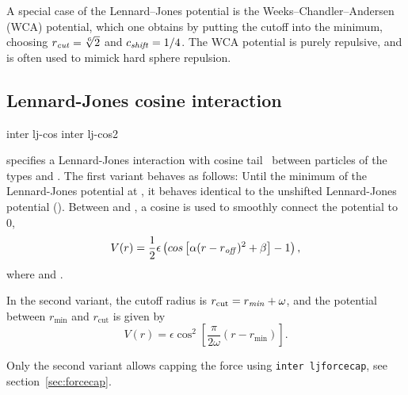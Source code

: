 A special case of the Lennard--Jones potential is the Weeks--Chandler--Andersen
(WCA) potential, which one obtains by putting the cutoff into the minimum, \ie
choosing $r_\text{\mbox{\textrm{\textit{cut}}}}=\sqrt[6]{2}$ and $c_\text{\mbox{\textrm{\textit{shift}}}}=1/4$. The WCA
potential is purely repulsive, and is often used to mimick hard sphere repulsion.

\subsection{Lennard-Jones cosine interaction}
\begin{essyntax}
  inter   lj-cos
  \var{$\epsilon$} \var{$\sigma$}
   
  inter   lj-cos2
  \var{$\epsilon$} \var{$\sigma$} 
   \var{$\omega$}
  \begin{features}
  \end{features}
\end{essyntax}
specifies a Lennard-Jones interaction with cosine tail~\cite{soddeman01a} between
particles of the types  and . The first variant behaves as
follows: Until the minimum of the Lennard-Jones potential at , it behaves identical to the
unshifted Lennard-Jones potential ().  Between
 and , a cosine is used to smoothly
connect the potential to 0, \ie
\begin{equation}
  V(r)=\frac{1}{2}\epsilon\left(cos\left[\alpha(r-r_\text{\mbox{\textrm{\textit{off}}}})^2 + \beta\right]-1\right),
\end{equation}
where
and
.

In the second variant, the cutoff radius is $r_\text{cut}=r_\text{\mbox{\textrm{\textit{min}}}} +
\omega$, and the potential between $r_\text{min}$ and $r_\text{cut}$ is given by
\begin{equation}
  V(r)=\epsilon\cos^2\left[\frac{\pi}{2\omega}(r - r_\text{min})\right].
\end{equation}

Only the second variant allows capping the force using {\tt inter ljforcecap},
see section~\ref{sec:forcecap}.

